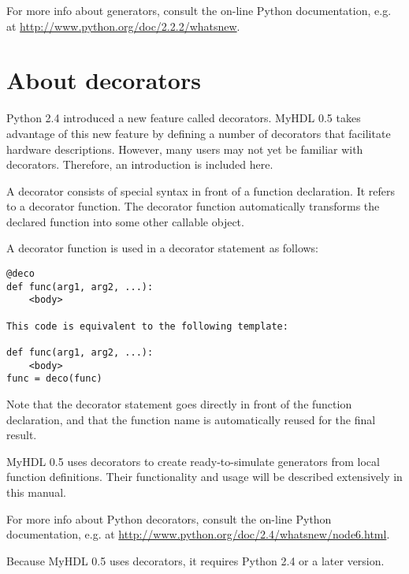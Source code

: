 For more info about generators, consult the on-line Python
documentation, e.g. at \url{http://www.python.org/doc/2.2.2/whatsnew}. 


\section{About decorators \label{deco}}

Python 2.4 introduced a new feature called decorators. MyHDL 0.5 takes
advantage of this new feature by defining a number of decorators that
facilitate hardware descriptions. However, many users may not yet be familiar with
decorators. Therefore, an introduction is included here.

A decorator consists of special syntax in front of a function
declaration. It refers to a decorator function. The decorator function
automatically transforms the declared function into some other
callable object.

A decorator function  is used in a decorator statement as follows:

\begin{verbatim}
@deco
def func(arg1, arg2, ...):
    <body>

This code is equivalent to the following template:

def func(arg1, arg2, ...):
    <body>
func = deco(func)
\end{verbatim}

Note that the decorator statement goes directly in front of the
function declaration, and that the function name  is automatically
reused for the final result.

MyHDL 0.5 uses decorators to create ready-to-simulate generators
from local function definitions. Their functionality
and usage will be described extensively in this manual.

For more info about Python decorators, consult the on-line Python
documentation, e.g. at \url{http://www.python.org/doc/2.4/whatsnew/node6.html}.

\begin{notice}[warning]
Because MyHDL 0.5 uses decorators, it requires Python 2.4 or a
later version.
\end{notice}
